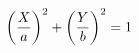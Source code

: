 \documentclass[preview]{standalone}
\begin{document}
\begin{align*}
\special{dvisvgm:raw <g id='unique000'>}\left(\frac{X}{a}\right)^2+\left(\frac{Y}{b}\right)^2=1\special{dvisvgm:raw </g>}
\end{align*}
\end{document}
